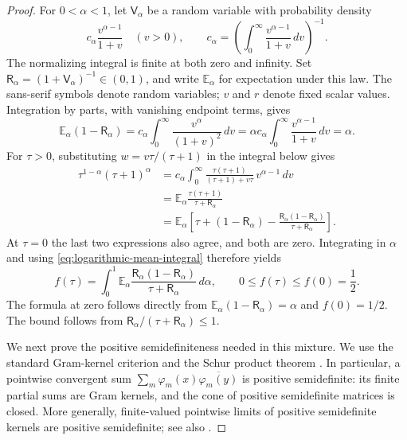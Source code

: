 \begin{proof}
For $0<\alpha<1$, let $\mathsf V_\alpha$ be a random variable with
probability density
\[
 c_\alpha\frac{v^{\alpha-1}}{1+v}\quad(v>0),
 \qquad
 c_\alpha=\left(\int_0^\infty
                      \frac{v^{\alpha-1}}{1+v}\,dv\right)^{-1}.
\]
The normalizing integral is finite at both zero and infinity. Set
$\mathsf R_\alpha=(1+\mathsf V_\alpha)^{-1}\in(0,1)$, and write
$\mathbb E_\alpha$ for expectation under this law. The sans-serif
symbols denote random variables; $v$ and $r$ denote fixed scalar
values. Integration by parts, with vanishing endpoint terms, gives
\[
 \mathbb E_\alpha(1-\mathsf R_\alpha)
 =c_\alpha\int_0^\infty\frac{v^\alpha}{(1+v)^2}\,dv
 =\alpha c_\alpha\int_0^\infty
                          \frac{v^{\alpha-1}}{1+v}\,dv
 =\alpha.
\]
For $\tau>0$, substituting $w=v\tau/(\tau+1)$ in the integral
below gives
\begin{equation}\label{eq:geometric-mean-integral}
 \begin{aligned}
 \tau^{1-\alpha}(\tau+1)^\alpha
 &=c_\alpha\int_0^\infty
   \frac{\tau(\tau+1)}{(\tau+1)+v\tau}\,v^{\alpha-1}\,dv\\
 &=\mathbb E_\alpha
       \frac{\tau(\tau+1)}{\tau+\mathsf R_\alpha}\\
 &=\mathbb E_\alpha\left[
       \tau+(1-\mathsf R_\alpha)
       -\frac{\mathsf R_\alpha(1-\mathsf R_\alpha)}
                    {\tau+\mathsf R_\alpha}\right].
 \end{aligned}
\end{equation}
At $\tau=0$ the last two expressions also agree, and both are zero.
Integrating in $\alpha$ and using
\cref{eq:logarithmic-mean-integral} therefore yields
\begin{equation}\label{eq:regularization-mixture}
 f(\tau)=\int_0^1\mathbb E_\alpha
       \frac{\mathsf R_\alpha(1-\mathsf R_\alpha)}
                    {\tau+\mathsf R_\alpha}\,d\alpha,
 \qquad 0\le f(\tau)\le f(0)=\frac12.
\end{equation}
The formula at zero follows directly from
$\mathbb E_\alpha(1-\mathsf R_\alpha)=\alpha$ and $f(0)=1/2$.
The bound follows from
$\mathsf R_\alpha/(\tau+\mathsf R_\alpha)\le1$.

We next prove the positive semidefiniteness needed in this mixture.
We use the standard Gram-kernel criterion and the Schur product
theorem \cite[Propositions 17.1 and 17.5]{GallierQuaintance}.
In particular, a pointwise convergent sum
$\sum_m\varphi_m(x)\overline{\varphi_m(y)}$ is positive
semidefinite: its finite partial sums are Gram kernels, and the
cone of positive semidefinite matrices is closed. More generally,
finite-valued pointwise limits of positive semidefinite kernels are
positive semidefinite; see also \cite[Problem 17.4]{GallierQuaintance}.


\end{proof}
